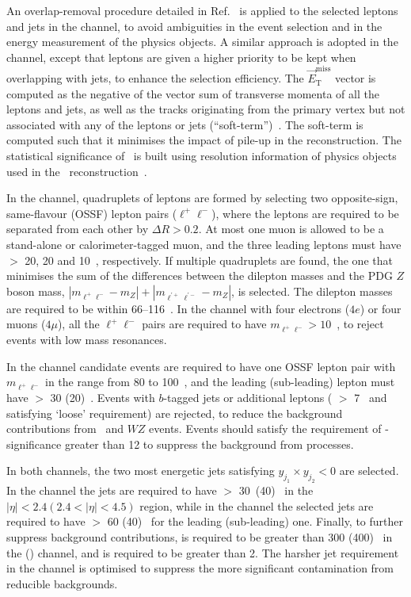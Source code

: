 An overlap-removal procedure detailed in Ref.~\cite{Aad:2016eki} is applied to the selected leptons and jets in the \llvvjj channel,
to avoid ambiguities in the event selection and in the energy measurement of the physics objects.
A similar approach is adopted in the \lllljj channel, except that leptons are given a higher priority to be kept when overlapping with jets, to enhance the selection efficiency.
The $\vec{E}_{\mathrm{T}}^{\mathrm{miss}}$ vector is computed as the negative of the vector sum of transverse momenta of all the leptons and jets, as well as the tracks originating from the primary vertex but not associated with any of the leptons or jets (``soft-term'')~\cite{ATL-PHYS-PUB-2015-027}. The soft-term is computed such that it minimises the impact of pile-up in the \met{} reconstruction. The statistical significance of \met~is built using resolution information of physics objects used in the \met~reconstruction~\cite{ATLAS-CONF-2018-038}.

In the \lllljj channel, quadruplets of leptons are formed by selecting two opposite-sign, same-flavour (OSSF) lepton pairs ($\ell^+\ell^-$), where the leptons are required to be separated from each other by $\Delta R >0.2$.
At most one muon is allowed to be a stand-alone or calorimeter-tagged muon, and the three leading leptons must have \pt{} $>$ 20, 20 and 10~\GeV{}, respectively.
If multiple quadruplets are found, the one that minimises the sum of the differences between the dilepton masses and the PDG $Z$ boson mass,
$|m_{\ell^+\ell^-} - m_Z| + |m_{\ell^{'+}\ell^{'-}} - m_Z|$, is selected.
The dilepton masses are required to be within 66--116~\GeV{}.
In the \lllljj channel with four electrons ($4e$) or four muons ($4\mu$), all the $\ell^+\ell^-$ pairs are required to have $m_{\ell^+\ell^-} > 10$~\GeV{},
to reject events with low mass resonances. 

In the \llvvjj channel candidate events  are required to have one OSSF lepton pair with $m_{\ell^+\ell^-}$ in the range from 80 to 100~\GeV{},
and the leading (sub-leading) lepton must have \pt{} $>$ 30 (20)~\GeV{}.
Events with $b$-tagged jets or additional leptons (\pt{} $>$ 7~\GeV{} and satisfying `loose' requirement) are rejected, to reduce the background contributions from \ttbar~and $WZ$ events.
Events should satisfy the requirement of \met-significance greater than 12 to suppress the background from \Zjet processes.

In both channels, the two most energetic jets satisfying $y_{j_1} \times y_{j_2} < 0$ are selected.
In the \lllljj channel the jets are required to have \pT $>$ 30~(40)~\GeV{} in the $|\eta| < 2.4 (2.4 < |\eta| < 4.5)$ region,
while in the \llvvjj channel the selected jets are required to have \pT $>$ 60 (40)~\GeV{} for the leading (sub-leading) one.
Finally, to further suppress background contributions, \mjj is required to be greater than 300 (400)~\GeV{} in the \lllljj (\llvvjj) channel, and \dyjj is required to be greater than 2.
The harsher jet requirement in the \llvvjj channel is optimised to suppress the more significant contamination from reducible backgrounds. 

